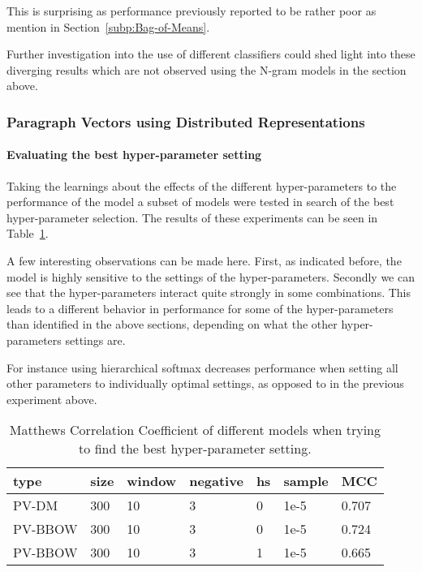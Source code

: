 This is surprising as performance previously reported to be rather poor as mention in Section~\ref{subp:Bag-of-Means}.

 Further investigation into the use of different classifiers could shed light into these diverging results which are not observed using the N-gram models in the section above. 

\subsubsection{Paragraph Vectors using Distributed Representations}




\paragraph{Evaluating the best hyper-parameter setting}

Taking the learnings about the effects of the different hyper-parameters to the performance of the model a subset of models were tested in search of the best hyper-parameter selection. The results of these experiments can be seen in Table~\ref{tab:Paragraph Vector Parameter Results Best}.

A few interesting observations can be made here. First, as indicated before, the model is highly sensitive to the settings of the hyper-parameters. Secondly we can see that the hyper-parameters interact quite strongly in some combinations. This leads to a different behavior in performance for some of the hyper-parameters than identified in the above sections, depending on what the other hyper-parameters settings are.

For instance using hierarchical softmax decreases performance when setting all other parameters to individually optimal settings, as opposed to in the previous experiment above.

\begin{table}[h]
  \begin{center}
  \begin{tabular}{ *6l | l }
    \toprule
    type & size & window & negative & hs & sample & MCC  \\
    \midrule
    PV-DM & 300 & 10 & 3 & 0 & 1e-5 & 0.707 \\
    PV-BBOW & 300 & 10 & 3 & 0 & 1e-5 & 0.724 \\
    PV-BBOW & 300 & 10 & 3 & 1 & 1e-5 & 0.665 \\
    \bottomrule
  \end{tabular}
  \caption{Matthews Correlation Coefficient of different models when trying to find the best hyper-parameter setting.}
\label{tab:Paragraph Vector Parameter Results Best}
\end{center}
\end{table}


